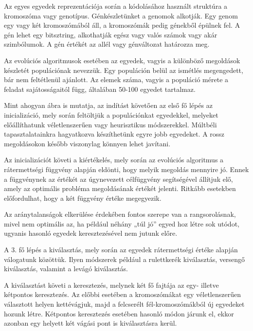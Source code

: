 \documentclass[12pt,a4paper,oneside]{report}
\begin{document}
Az egyes egyedek reprezentációja során a kódolásához használt struktúra a kromoszóma vagy genotípus. 
Génkészletünket a genomok alkotják. 
Egy genom egy vagy két kromoszómából áll, a kromoszómák pedig génekből épülnek fel. 
A gén lehet egy bitsztring, alkothatják egész vagy valós számok vagy akár szimbólumok. 
A gén értékét az allél vagy génváltozat határozza meg.

Az evolúciós algoritmusok esetében az egyedek, vagyis a különböző megoldások készletét populációnak nevezzük. 
Egy populáción belül az ismétlés megengedett, bár nem feltétlenül ajánlott. 
Az elemek száma, vagyis a populáció mérete a feladat sajátosságaitól függ, általában 50-100 egyedet tartalmaz.


Mint ahogyan  ábra is mutatja, az indítást követően az első fő lépés az inicializáció, mely során feltöltjük a populációnkat egyedekkel, melyeket előállíthatunk véletlenszerűen vagy heurisztikus módszerekkel. 
Múltbéli tapasztalatainkra hagyatkozva készíthetünk egyre jobb egyedeket. 
A rossz megoldásokon később viszonylag könnyen lehet javítani. 

Az inicializációt követi a kiértékelés, mely során az evolúciós algoritmus a rátermettségi függvény alapján eldönti, hogy melyik megoldás mennyire jó.
Ennek a függvénynek az értékét az úgynevezett célfüggvény segítségével állítjuk elő, amely az optimális probléma megoldásának értékét jelenti. 
Ritkább esetekben előfordulhat, hogy a két függvény értéke megegyezik.

Az aránytalanságok elkerülése érdekében fontos szerepe van a rangsorolásnak, mivel nem optimális az, ha például néhány „túl jó” egyed hoz létre sok utódot, ugyanis hasonló egyedek keresztezésével nem jutunk előre.

A 3. fő lépés a kiválasztás, mely során az egyedek rátermettségi értéke alapján válogatunk közöttük. 
Ilyen módszerek például a rulettkerék kiválasztás, versengő kiválasztás, valamint a levágó kiválasztás.

A kiválasztást követi a keresztezés, melynek két fő fajtája az egy- illetve kétpontos keresztezés. 
Az előbbi esetében a kromoszómákat egy véletlenszerűen választott helyen kettévágjuk, majd a felcserélt fél-kromoszómákból új egyedeket hozunk létre. 
Kétpontos keresztezés esetében hasonló módon járunk el, ekkor azonban egy helyett két vágási pont is kiválasztásra kerül.
\end{document}
